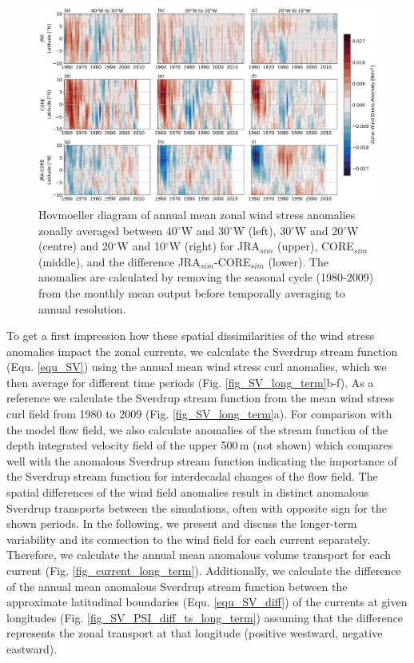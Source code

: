 \documentclass[os, manuscript]{copernicus}
\begin{document}
	\begin{figure}[t]
		\includegraphics[width=12cm]{../../figures/paper/f08_INALT_JRA_CORE_taux_anomaly_hovm_merid_all_lon.png}
		\caption{Hovmoeller diagram of annual mean zonal wind stress anomalies zonally averaged between 40$^{\circ}$W and 30$^{\circ}$W (left), 30$^{\circ}$W and 20$^{\circ}$W (centre) and 20$^{\circ}$W and 10$^{\circ}$W (right) for JRA$_{sim}$ (upper), CORE$_{sim}$ (middle), and the difference JRA$_{sim}$-CORE$_{sim}$ (lower). The anomalies are calculated by removing the seasonal cycle (1980-2009) from the monthly mean output before temporally averaging to annual resolution.
		}
		\label{fig_taux_long_term}
	\end{figure}
	
	To get a first impression how these spatial dissimilarities of the wind stress anomalies impact the zonal currents, we calculate the Sverdrup stream function (Equ. \ref{equ_SV}) using the annual mean wind stress curl anomalies, which we then average for different time periods (Fig. \ref{fig_SV_long_term}b-f). As a reference we calculate the Sverdrup stream function from the mean wind stress curl field from 1980 to 2009 (Fig. \ref{fig_SV_long_term}a). For comparison with the model flow field, we also calculate anomalies of the stream function of the depth integrated velocity field of the upper 500$\,$m (not shown) which compares well with the anomalous Sverdrup stream function indicating the importance of the Sverdrup stream function for interdecadal changes of the flow field. The spatial differences of the wind field anomalies result in distinct anomalous Sverdrup transports between the simulations, often with opposite sign for the shown periods. In the following, we present and discuss the longer-term variability and its connection to the wind field for each current separately. Therefore, we calculate the annual mean anomalous volume transport for each current (Fig. \ref{fig_current_long_term}). Additionally, we calculate the difference of the annual mean anomalous Sverdrup stream function between the approximate latitudinal boundaries (Equ. \ref{equ_SV_diff}) of the currents at given longitudes (Fig. \ref{fig_SV_PSI_diff_ts_long_term}) assuming that the difference represents the zonal transport at that longitude (positive westward, negative eastward).
	
\end{document}

